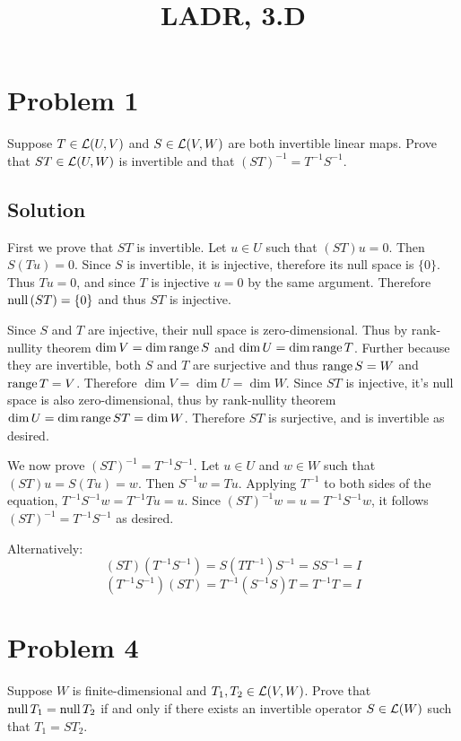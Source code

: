 \documentclass{article}
\title{LADR, 3.D}
\begin{document}
\maketitle

\section*{Problem 1}
Suppose $T\in\L(U,V)$ and $S\in\L(V,W)$ are both invertible linear maps. Prove that $ST\in\L(U,W)$ is invertible and that $(ST)^{-1}=T^{-1}S^{-1}$.

\subsection*{Solution}
First we prove that $ST$ is invertible. Let $u\in U$ such that $(ST)u=0$. Then $S(Tu)=0$. Since $S$ is invertible, it is injective, therefore its null space is $\{0\}$. Thus $Tu=0$, and since $T$ is injective $u=0$ by the same argument. Therefore $\text{null}\, (ST)=\{0\}$ and thus $ST$ is injective.

\vs

Since $S$ and $T$ are injective, their null space is zero-dimensional. Thus by rank-nullity theorem $\dim V=\dim\text{range}\, S$ and $\dim U=\dim\text{range}\, T$. Further because they are invertible, both $S$ and $T$ are surjective and thus $\text{range}\, S=W$ and $\text{range}\, T=V$. Therefore $\dim V=\dim U=\dim W$. Since $ST$ is injective, it's null space is also zero-dimensional, thus by rank-nullity theorem $\dim U=\dim\text{range}\, ST=\dim W$. Therefore $ST$ is surjective, and is invertible as desired.

\vs

We now prove $(ST)^{-1}=T^{-1}S^{-1}$. Let $u\in U$ and $w\in W$ such that $(ST)u=S(Tu)=w$. Then $S^{-1}w=Tu$. Applying $T^{-1}$ to both sides of the equation, $T^{-1}S^{-1}w=T^{-1}Tu=u$. Since $(ST)^{-1}w=u=T^{-1}S^{-1}w$, it follows $(ST)^{-1}=T^{-1}S^{-1}$ as desired.

\vs

Alternatively:
\[(ST)(T^{-1}S^{-1})=S(TT^{-1})S^{-1}=SS^{-1}=I\]
\[(T^{-1}S^{-1})(ST)=T^{-1}(S^{-1}S)T=T^{-1}T=I\]

\newpage
\section*{Problem 4}
Suppose $W$ is finite-dimensional and $T_1, T_2\in\L(V,W)$. Prove that $\text{null}\, T_1=\text{null}\, T_2$ if and only if there exists an invertible operator $S\in\Lo(W)$ such that $T_1=ST_2$.
\end{document}
